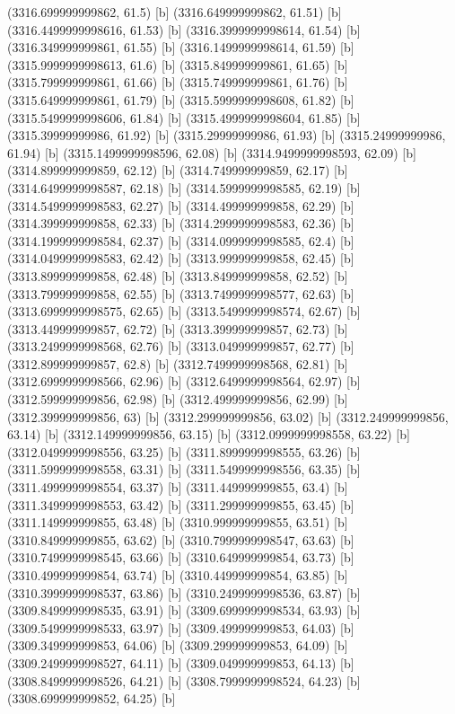{{{(3316.699999999862, 61.5) [b] 
(3316.649999999862, 61.51) [b] 
(3316.4499999998616, 61.53) [b] 
(3316.3999999998614, 61.54) [b] 
(3316.349999999861, 61.55) [b] 
(3316.1499999998614, 61.59) [b] 
(3315.9999999998613, 61.6) [b] 
(3315.849999999861, 61.65) [b] 
(3315.799999999861, 61.66) [b] 
(3315.749999999861, 61.76) [b] 
(3315.649999999861, 61.79) [b] 
(3315.5999999998608, 61.82) [b] 
(3315.5499999998606, 61.84) [b] 
(3315.4999999998604, 61.85) [b] 
(3315.39999999986, 61.92) [b] 
(3315.29999999986, 61.93) [b] 
(3315.24999999986, 61.94) [b] 
(3315.1499999998596, 62.08) [b] 
(3314.9499999998593, 62.09) [b] 
(3314.899999999859, 62.12) [b] 
(3314.749999999859, 62.17) [b] 
(3314.6499999998587, 62.18) [b] 
(3314.5999999998585, 62.19) [b] 
(3314.5499999998583, 62.27) [b] 
(3314.499999999858, 62.29) [b] 
(3314.399999999858, 62.33) [b] 
(3314.2999999998583, 62.36) [b] 
(3314.1999999998584, 62.37) [b] 
(3314.0999999998585, 62.4) [b] 
(3314.0499999998583, 62.42) [b] 
(3313.999999999858, 62.45) [b] 
(3313.899999999858, 62.48) [b] 
(3313.849999999858, 62.52) [b] 
(3313.799999999858, 62.55) [b] 
(3313.7499999998577, 62.63) [b] 
(3313.6999999998575, 62.65) [b] 
(3313.5499999998574, 62.67) [b] 
(3313.449999999857, 62.72) [b] 
(3313.399999999857, 62.73) [b] 
(3313.2499999998568, 62.76) [b] 
(3313.049999999857, 62.77) [b] 
(3312.899999999857, 62.8) [b] 
(3312.7499999998568, 62.81) [b] 
(3312.6999999998566, 62.96) [b] 
(3312.6499999998564, 62.97) [b] 
(3312.599999999856, 62.98) [b] 
(3312.499999999856, 62.99) [b] 
(3312.399999999856, 63) [b] 
(3312.299999999856, 63.02) [b] 
(3312.249999999856, 63.14) [b] 
(3312.149999999856, 63.15) [b] 
(3312.0999999998558, 63.22) [b] 
(3312.0499999998556, 63.25) [b] 
(3311.8999999998555, 63.26) [b] 
(3311.5999999998558, 63.31) [b] 
(3311.5499999998556, 63.35) [b] 
(3311.4999999998554, 63.37) [b] 
(3311.449999999855, 63.4) [b] 
(3311.3499999998553, 63.42) [b] 
(3311.299999999855, 63.45) [b] 
(3311.149999999855, 63.48) [b] 
(3310.999999999855, 63.51) [b] 
(3310.849999999855, 63.62) [b] 
(3310.7999999998547, 63.63) [b] 
(3310.7499999998545, 63.66) [b] 
(3310.649999999854, 63.73) [b] 
(3310.499999999854, 63.74) [b] 
(3310.449999999854, 63.85) [b] 
(3310.3999999998537, 63.86) [b] 
(3310.2499999998536, 63.87) [b] 
(3309.8499999998535, 63.91) [b] 
(3309.6999999998534, 63.93) [b] 
(3309.5499999998533, 63.97) [b] 
(3309.499999999853, 64.03) [b] 
(3309.349999999853, 64.06) [b] 
(3309.299999999853, 64.09) [b] 
(3309.2499999998527, 64.11) [b] 
(3309.049999999853, 64.13) [b] 
(3308.8499999998526, 64.21) [b] 
(3308.7999999998524, 64.23) [b] 
(3308.699999999852, 64.25) [b] 
}}}
